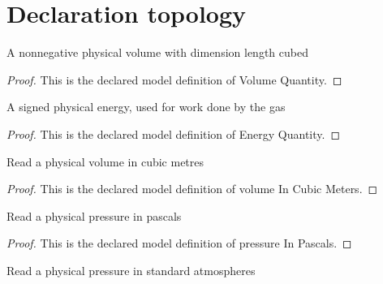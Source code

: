\section{Declaration topology}
\begin{definition}
  \label{def:physics:phyx-mini-0348:phyxminiproblems-problemphyxmini0348-volumequantity}
  A nonnegative physical volume with dimension length cubed
\end{definition}
\begin{proof}
  This is the declared model definition of Volume Quantity.
\end{proof}
\begin{definition}
  \label{def:physics:phyx-mini-0348:phyxminiproblems-problemphyxmini0348-energyquantity}
  A signed physical energy, used for work done by the gas
\end{definition}
\begin{proof}
  This is the declared model definition of Energy Quantity.
\end{proof}
\begin{definition}
  \label{def:physics:phyx-mini-0348:phyxminiproblems-problemphyxmini0348-volumeincubicmeters}
  Read a physical volume in cubic metres
\end{definition}
\begin{proof}
  This is the declared model definition of volume In Cubic Meters.
\end{proof}
\begin{definition}
  \label{def:physics:phyx-mini-0348:phyxminiproblems-problemphyxmini0348-pressureinpascals}
  Read a physical pressure in pascals
\end{definition}
\begin{proof}
  This is the declared model definition of pressure In Pascals.
\end{proof}
\begin{definition}
  \label{def:physics:phyx-mini-0348:phyxminiproblems-problemphyxmini0348-pressureinatmospheres}
  Read a physical pressure in standard atmospheres
\end{definition}
